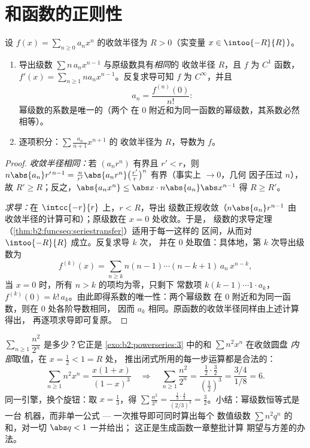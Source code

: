 \section{和函数的正则性}

\begin{theorem}[逐项微积分]\label{thm:b2:powerseries:calculus}
设 $f(x) = \sum_{n\geq0} a_n x^n$ 的收敛半径为 $R > 0$（实变量
$x \in \intoo{-R}{R}$）。
\begin{enumerate}
  \item 导出级数 $\sum n\,a_n x^{n-1}$ 与原级数具有\emph{相同}的
        收敛半径 $R$，且 $f$ 为 $C^1$ 函数，$f'(x) = \sum_{n \geq 1}
        n a_n x^{n-1}$。反复求导可知 $f$ 为 $C^\infty$，并且
        \[
        a_n = \frac{f^{(n)}(0)}{n!} :
        \]
        幂级数的系数是唯一的（两个
        在 $0$ 附近和为同一函数的幂级数，其系数必然相等）。
  \item 逐项积分：$\sum \frac{a_n}{n+1}x^{n+1}$ 的
        收敛半径为 $R$，导数为 $f$。
\end{enumerate}
\end{theorem}

\begin{proof}
\emph{收敛半径相同：}若 $(a_nr^n)$ 有界且 $r' < r$，则
$n\abs{a_n} r'^{\,n-1} = \frac{n}{r'}\abs{a_nr^n}
\bigl(\frac{r'}{r}\bigr)^n$ 有界（事实上 $\to 0$，几何
因子压过 $n$），故 $R' \geq R$；反之，$\abs{a_n x^n} \leq \abs x
\cdot n\abs{a_n}\abs x^{n-1}$ 得 $R \geq R'$。

\emph{求导：}在 $\intcc{-r}{r}$ 上，$r < R$，导出
级数正规收敛（$n\abs{a_n}r^{n-1}$ 由
收敛半径的计算可和）；原级数在 $x = 0$ 处收敛。于是，
级数的求导定理
（\cref{thm:b2:funcseq:seriestransfer}）适用于每一这样的
区间，从而对 $\intoo{-R}{R}$ 成立。反复求导 $k$ 次，
并在 $0$ 处取值：具体地，第 $k$ 次导出级数为
\[
f^{(k)}(x) = \sum_{n\geq k} n(n-1)\cdots(n-k+1)\,a_n\,x^{n-k},
\]
当 $x = 0$ 时，所有 $n > k$ 的项均为零，只剩下
常数项 $k(k-1)\cdots1\cdot a_k$，$f^{(k)}(0) =
k!\,a_k$。由此即得系数的唯一性：两个幂级数
在 $0$ 附近和为同一函数，则在 $0$ 处各阶导数相同，
因而 $a_k$ 相同。原函数的收敛半径同样由上述计算得出，
再逐项求导即可复原。
\end{proof}

\begin{example}[在一点处计算级数]\label{ex:b2:powerseries:evaluate}
$\sum_{n\geq1}\dfrac{n^2}{2^n}$ 是多少？它正是
\cref{exo:b2:powerseries:3} 中的和 $\sum n^2x^n$ 在收敛圆盘
\emph{内部}取值，在 $x = \frac12 < 1 = R$ 处，
推出闭式所用的每一步运算都是合法的：
\[
\sum_{n\geq1} n^2x^n = \frac{x(1+x)}{(1-x)^3}
\quad\Longrightarrow\quad
\sum_{n\geq1}\frac{n^2}{2^n}
= \frac{\frac12\cdot\frac32}{(\frac12)^3}
= \frac{3/4}{1/8} = 6 .
\]
同一引擎，换个旋钮：取 $x = \frac13$，得
$\sum\frac{n^2}{3^n} = \frac{\frac13\cdot\frac43}{(2/3)^3} =
\frac32$。小结：幂级数恒等式是一台
机器，而非单一公式 --- 一次推导即可同时算出每个
数值级数 $\sum n^2q^n$ 的和，对一切 $\abs q < 1$ 一并给出；
这正是生成函数一章整批计算
期望与方差的办法。
\end{example}

